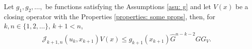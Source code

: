 \begin{lem}\label{lem: rh bnd}
	Let \(g_1, g_2, \dots,\) be functions satisfying the Assumptions \ref{asu: g} and let \(V(x)\) be a closing operator with the Properties \ref{properties: some props}, then, for \(k,n\in\{1,2,\dots\},\, k+1 < n\), 
	\begin{align*}
            	\mathcal J_{k+1,n}(u_k,x_{k+1})  V(x) \leq  g_{k+1}(x_{k+1})\widehat G^{n-k-2} G G_V.
	\end{align*}
\end{lem}
